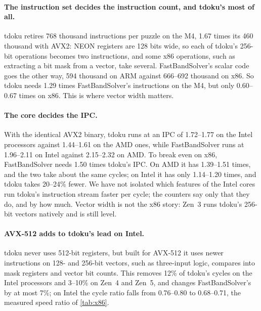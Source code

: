 \documentclass[11pt]{article}
\theoremstyle{definition}
\theoremstyle{plain}
\begin{document}
\paragraph{The instruction set decides the instruction count, and tdoku's most of all.} tdoku retires 768 thousand
instructions per puzzle on the M4, 1.67 times its 460 thousand with AVX2: NEON registers are 128 bits wide, so each of
tdoku's 256-bit operations becomes two instructions, and some x86 operations, such as extracting a bit mask from a
vector, take several. FastBandSolver's scalar code goes the other way, 594 thousand on ARM against 666--692 thousand on
x86. So tdoku needs 1.29 times FastBandSolver's instructions on the M4, but only 0.60--0.67 times on x86. This is where
vector width matters.

\paragraph{The core decides the IPC.} With the identical AVX2 binary, tdoku runs at an IPC of 1.72--1.77 on the Intel
processors against 1.44--1.61 on the AMD ones, while FastBandSolver runs at 1.96--2.11 on Intel against 2.15--2.32 on
AMD. To break even on x86, FastBandSolver needs 1.50 times tdoku's IPC. On AMD it has 1.39--1.51 times, and the two take
about the same cycles; on Intel it has only 1.14--1.20 times, and tdoku takes 20--24\% fewer. We have not isolated
which features of the Intel cores run tdoku's instruction stream faster per cycle; the counters say only that they do,
and by how much. Vector width is not the x86 story: Zen~3 runs tdoku's 256-bit vectors natively and is still level.

\paragraph{AVX-512 adds to tdoku's lead on Intel.} tdoku never uses 512-bit registers, but built for AVX-512 it uses
newer instructions on 128- and 256-bit vectors, such as three-input logic, compares into mask registers and vector bit
counts. This removes 12\% of tdoku's cycles on the Intel processors and 3--10\% on Zen~4 and Zen~5, and changes
FastBandSolver's by at most 7\%; on Intel the cycle ratio falls from 0.76--0.80 to 0.68--0.71, the measured speed
ratio of \cref{tab:x86}.
\end{document}
